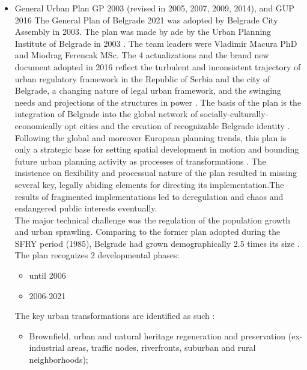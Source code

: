 \documentclass[11pt]{report}
\begin{document}
\begin{itemize}
\item General Urban Plan GP 2003 (revised in 2005, 2007, 2009, 2014), and GUP 2016
The  General  Plan  of  Belgrade  2021 was adopted  by  Belgrade  City 
Assembly in 2003. The plan was made by ade  by  the  Urban  Planning  Institute  of  Belgrade  in  2003 \cite{ref Official Gazette of the City of Belgrade no 27/03}. The team leaders were Vladimir Macura PhD and Miodrag Ferencak MSc.
The 4 actualizations and the brand new document adopted in 2016 reflect the turbulent and inconsistent trajectory of urban regulatory framework in the Republic of Serbia and the city of Belgrade, a changing nature of legal urban framework, and the swinging needs and projections of the structures in power
\cite{Vukmirovic in Doytchinov et al 2015}.
The basis of the plan is the integration of Belgrade into the global network of socially-culturally-economically opt cities and the creation of recognizable Belgrade identity \cite{ref}.
\\
Following the global and moreover European planning trends, this plan is only a  strategic base for setting spatial development in motion and bounding future urban planning activity as processes of transformations \cite{Grozdanic}.
The insistence on flexibility and processual nature of the plan resulted in missing several key, legally abiding elements for directing its  implementation.\footnotemark The results of fragmented implementations led to deregulation and chaos and endangered public interests eventually.
\\
The major technical challenge was the regulation of the population growth and urban sprawling.
Comparing to the former plan adopted during the SFRY period (1985), Belgrade had grown demographically 2.5 times its size \cite{ref}.
The plan recognizes 2 developmental phases:
\begin{itemize}
\item until 2006
\item 2006-2021
\end{itemize}
The key urban transformations are identified as such \cite{Stupar 2004}:
\begin{itemize}
\item Brownfield, urban and natural heritage regeneration and preservation (ex-industrial  areas,  traffic  nodes, riverfronts,  suburban  and  rural neighborhoods);

\end{itemize}
\end{itemize}
\end{document}
